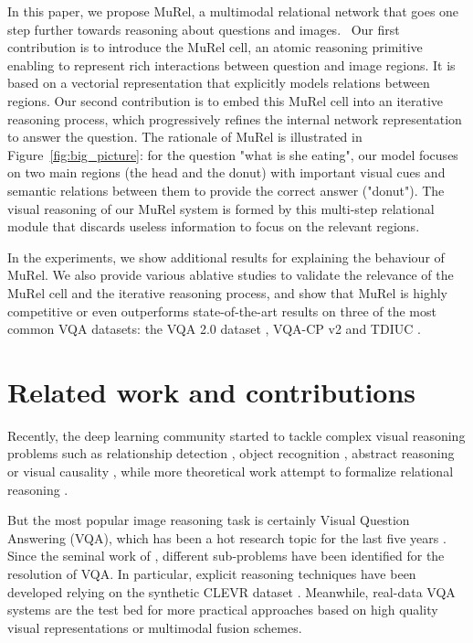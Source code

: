 \documentclass[10pt,twocolumn,letterpaper]{article}
\begin{document}
In this paper, we propose MuRel, a multimodal relational network that goes one step further towards reasoning about questions and images.
~Our first contribution is to introduce the MuRel cell, an atomic reasoning primitive enabling to represent rich interactions between question and image regions. It is based on a vectorial representation that explicitly models relations between regions. 
Our second contribution is to embed this MuRel cell into an iterative reasoning process, which progressively refines the internal network representation to answer the question. 
The rationale of MuRel is illustrated in Figure~\ref{fig:big_picture}: for the question "what is she eating", our model focuses on two main regions (the head and the donut) with important visual cues and semantic relations between them to provide the correct answer ("donut"). 
The visual reasoning of our MuRel system is formed by this multi-step relational module that discards useless information to focus on the relevant regions.

In the experiments, we show additional results for explaining the behaviour of MuRel. We also provide various ablative studies to validate the relevance of the  MuRel cell and the iterative reasoning process, and show that MuRel is highly competitive or even outperforms state-of-the-art results on three of the most common VQA datasets: the VQA 2.0 dataset \cite{VQA2_Goyal_2017_CVPR}, VQA-CP v2 \cite{vqa-cp} and TDIUC \cite{Kafle_2017_ICCV}.

 \section{Related work and contributions}

Recently, the deep learning community started to tackle complex visual reasoning problems such as relationship detection \cite{VRD_Lu_2016_ECCV}, object recognition \cite{chen18iterative}, abstract reasoning \cite{SantoroHBML18} or visual causality \cite{LopNisChiSchBot17}, while more theoretical work attempt to formalize relational reasoning \cite{DBLP:journals/corr/abs-1806-01261}.

But the most popular image reasoning task is certainly Visual Question Answering (VQA), which has been a hot research topic for the last five years \cite{malinowski2014nips, VQA, VQA2_Goyal_2017_CVPR, Kafle_2017_ICCV}. 
Since the seminal work of \cite{malinowski2014nips}, different sub-problems have been identified for the resolution of VQA. In particular, explicit reasoning techniques have been developed relying on the synthetic CLEVR dataset \cite{johnson2016clevr}. Meanwhile, real-data VQA systems are the test bed for more practical approaches based on high quality visual representations or multimodal fusion schemes.
\end{document}
